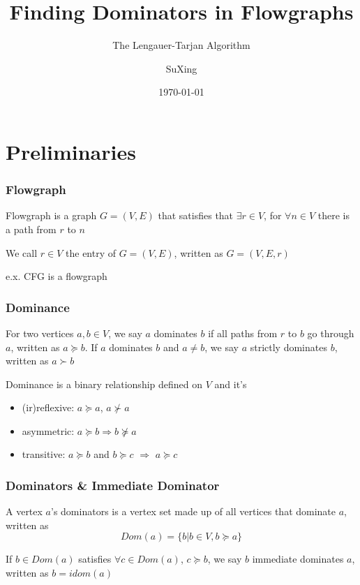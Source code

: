 \documentclass[]{beamer}
\title{Finding Dominators in Flowgraphs}
\subtitle{The Lengauer-Tarjan Algorithm}
\author[SuXing~pysuxing@gmail.com]{SuXing}
\institute{TOW}
\date{\today}
\begin{document}
\setlength{\parindent}{0pt}

\frame{\titlepage}
\frame{\tableofcontents}

\section{Preliminaries}
\frame{\tableofcontents[currentsection]}

\begin{frame}
  \frametitle{Flowgraph}
  \begin{definition}
    \alert{Flowgraph} is a graph $G=(V, E)$ that satisfies that $\exists r \in V$,
    for $\forall n \in V$ there is a path from $r$ to $n$
  \end{definition}
  \vspace{1em}\pause
  We call $r \in V$ the \alert{entry} of $G=(V, E)$, written as $G=(V, E, r)$

  \vspace{1em}\pause
  e.x. CFG is a flowgraph            %
\end{frame}

\begin{frame}
  \frametitle{Dominance}
  \begin{definition}
    For two vertices $a, b \in V$, we say $a$ \alert{dominates} $b$ if all paths from $r$ to $b$
    go through $a$, written as $a \succeq b$. If $a$ dominates $b$ and $a \neq b$, we say $a$
    \alert{strictly dominates} $b$, written as $a \succ b$
  \end{definition}

  \pause
  Dominance is a binary relationship defined on $V$ and it's
  \begin{itemize}
    \item (ir)reflexive: $a \succeq a$, $a \nsucc a$
    \item asymmetric: $a \succeq b \Rightarrow b \nsucceq a$
    \item transitive: $a \succeq b$ and $b \succeq c$ $\Rightarrow$ $a \succeq c$
  \end{itemize}
\end{frame}

\begin{frame}
  \frametitle{Dominators \& Immediate Dominator}
  \begin{definition}
    A vertex $a$'s \alert{dominators} is a vertex set made up of all vertices that dominate $a$,
    written as $$Dom(a)=\{ b | b \in V, b \succeq a \}$$
  \end{definition}
  \pause
  \begin{definition}
    If $b \in Dom(a)$ satisfies $\forall c \in Dom(a)$, $c \succeq b$, we say $b$
    \alert{immediate dominates} $a$, written as $b=idom(a)$
  \end{definition}
\end{frame}
\end{document}
